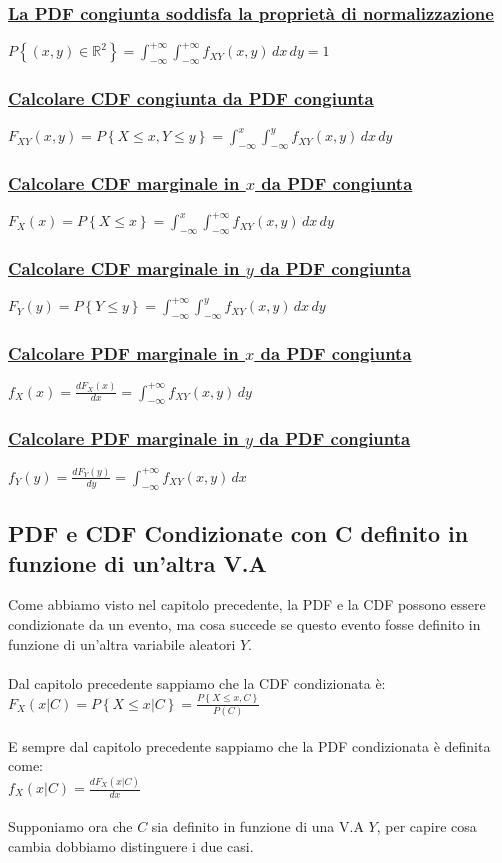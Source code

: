 \documentclass{article}
\begin{document}
\subsubsection{\underline{La PDF congiunta soddisfa la proprietà di normalizzazione}}
$P \left\{(x,y) \in \mathbb{R}^2 \right\} = \int_{-\infty}^{+\infty} \int_{-\infty}^{+\infty} f_{XY}(x,y) \,dx\,dy = 1$
\subsubsection{\underline{Calcolare CDF congiunta da PDF congiunta}}
$F_{XY}(x,y) = P\left\{X \leq x , Y \leq y \right\} = \int_{-\infty}^{x} \int_{-\infty}^{y} f_{XY}(x,y) \,dx\,dy$
\subsubsection{\underline{Calcolare CDF marginale in $x$ da PDF congiunta}}
$F_X(x) = P \left\{X \leq x \right\} = \int_{-\infty}^{x} \int_{-\infty}^{+\infty} f_{XY}(x,y) \,dx \,dy $
\subsubsection{\underline{Calcolare CDF marginale in $y$ da PDF congiunta}}
$F_Y(y) = P \left\{Y \leq y \right\} = \int_{-\infty}^{+\infty} \int_{-\infty}^{y} f_{XY}(x,y) \,dx \,dy $
\subsubsection{\underline{Calcolare PDF marginale in $x$ da PDF congiunta}}
$f_X(x) = \frac{dF_X(x)}{dx} = \int_{-\infty}^{+\infty} f_{XY}(x,y) \,dy$
\subsubsection{\underline{Calcolare PDF marginale in $y$ da PDF congiunta}}
$f_Y(y) = \frac{dF_Y(y)}{dy} = \int_{-\infty}^{+\infty} f_{XY}(x,y) \,dx$

\subsection{PDF e CDF Condizionate con C definito in funzione di un’altra V.A}
Come abbiamo visto nel capitolo precedente, la PDF e la CDF possono essere condizionate da un evento, ma cosa succede se questo evento fosse definito in funzione di un’altra variabile aleatori $Y$. \\ \\
Dal capitolo precedente sappiamo che la CDF condizionata è: \\
$F_X(x|C) = P\left\{X \leq x |C \right\} = \frac{P\left\{X \leq x ,C\right\}}{P(C)}$ \\ \\
E sempre dal capitolo precedente sappiamo che la PDF condizionata è definita come: \\
$f_X(x|C) = \frac{dF_X(x|C)}{dx}$ \\ \\
Supponiamo ora che $C$ sia definito in funzione di una V.A $Y$, per capire cosa cambia dobbiamo distinguere i due casi.
\end{document}
